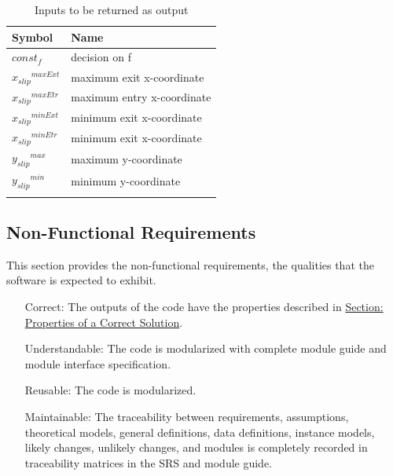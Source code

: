 \documentclass[12pt]{article}
\begin{document}
\begin{longtable}{l l}
\toprule
\textbf{Symbol} & \textbf{Name}
\\
\midrule
\endhead
$const_f$ & decision on f
\\
${{x_{slip}}^{maxExt}}$ & maximum exit x-coordinate
\\
${{x_{slip}}^{maxEtr}}$ & maximum entry x-coordinate
\\
${{x_{slip}}^{minExt}}$ & minimum exit x-coordinate
\\
${{x_{slip}}^{minEtr}}$ & minimum exit x-coordinate
\\
${{y_{slip}}^{max}}$ & maximum y-coordinate
\\
${{y_{slip}}^{min}}$ & minimum y-coordinate
\\
\bottomrule
\caption{Inputs to be returned as output}
\label{Table:inputsToOutputTable}
\end{longtable}
\subsection{Non-Functional Requirements}
\label{Sec:NFRs}
This section provides the non-functional requirements, the qualities that the software is expected to exhibit.
\begin{itemize}
\item[Correct:\phantomsection\label{correct}]The outputs of the code have the properties described in \hyperref[Sec:CorSolProps]{Section: Properties of a Correct Solution}.
\item[Understandable:\phantomsection\label{understandable}]The code is modularized with complete module guide and module interface specification.
\item[Reusable:\phantomsection\label{reusable}]The code is modularized.
\item[Maintainable:\phantomsection\label{maintainable}]The traceability between requirements, assumptions, theoretical models, general definitions, data definitions, instance models, likely changes, unlikely changes, and modules is completely recorded in traceability matrices in the SRS and module guide.
\end{itemize}
\end{document}
